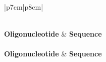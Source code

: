 \footnotesize
\begin{longtable}[l]{ |p{7cm}|p{8cm}| }
\caption[Oligonucleotides used in this study]{\textbf{Oligonucleotides Used in This Study}}\\ %
\hline
\label{tab:tableoligos}
\textbf{Oligonucleotide} & \textbf{Sequence} \\
\hline
\endfirsthead
{} \\
\hline
\textbf{Oligonucleotide} & \textbf{Sequence} \\
\hline
\endhead

\end{longtable}
